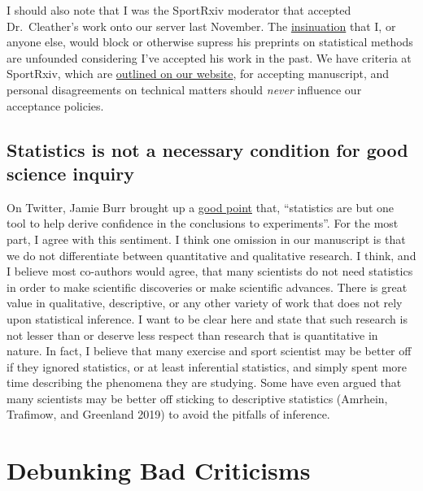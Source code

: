 \documentclass[
]{article}
\begin{document}
I should also note that I was the SportRxiv moderator that accepted
Dr.~Cleather's work onto our server last November. The
\href{https://twitter.com/dr_jump_uk/status/1296800260082339840?s=20}{insinuation}
that I, or anyone else, would block or otherwise supress his preprints
on statistical methods are unfounded considering I've accepted his work
in the past. We have criteria at SportRxiv, which are
\href{https://www.sportrxiv.org/submission-guidelines/}{outlined on our
website}, for accepting manuscript, and personal disagreements on
technical matters should \emph{never} influence our acceptance policies.

\hypertarget{statistics-is-not-a-necessary-condition-for-good-science-inquiry}{%
\subsection{Statistics is not a necessary condition for good science
inquiry}\label{statistics-is-not-a-necessary-condition-for-good-science-inquiry}}

On Twitter, Jamie Burr brought up a
\href{https://twitter.com/Dr_Burr/status/1297436782938722305?s=20}{good
point} that, ``statistics are but one tool to help derive confidence in
the conclusions to experiments''. For the most part, I agree with this
sentiment. I think one omission in our manuscript is that we do not
differentiate between quantitative and qualitative research. I think,
and I believe most co-authors would agree, that many scientists do not
need statistics in order to make scientific discoveries or make
scientific advances. There is great value in qualitative, descriptive,
or any other variety of work that does not rely upon statistical
inference. I want to be clear here and state that such research is not
lesser than or deserve less respect than research that is quantitative
in nature. In fact, I believe that many exercise and sport scientist may
be better off if they ignored statistics, or at least inferential
statistics, and simply spent more time describing the phenomena they are
studying. Some have even argued that many scientists may be better off
sticking to descriptive statistics (Amrhein, Trafimow, and Greenland
2019) to avoid the pitfalls of inference.

\hypertarget{debunking-bad-criticisms}{%
\section{Debunking Bad Criticisms}\label{debunking-bad-criticisms}}
\end{document}
